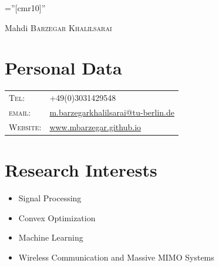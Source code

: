 \documentclass[a4paper,10pt]{article}
\begin{document}
\pagestyle{empty} %

\font\fb=''[cmr10]'' %

\par{\centering
		{\Huge Mahdi \textsc{Barzegar Khalilsarai}
	}\bigskip\par}

\section{Personal Data}

\begin{tabular}{ll}
   \textsc{Tel:}     & +49(0)3031429548\\
   \textsc{email:}     & \href{m.barzegarkhalilsarai@tu-berlin.de}{m.barzegarkhalilsarai@tu-berlin.de}\\
   \textsc{Website:}     & \href{https://mbarzegar.github.io/}{www.mbarzegar.github.io}\\
\end{tabular}


\section{Research Interests}
\begin{itemize}
 \item Signal Processing
\item Convex Optimization
\item Machine Learning
\item Wireless Communication and Massive MIMO Systems
\end{itemize}


\end{document}
